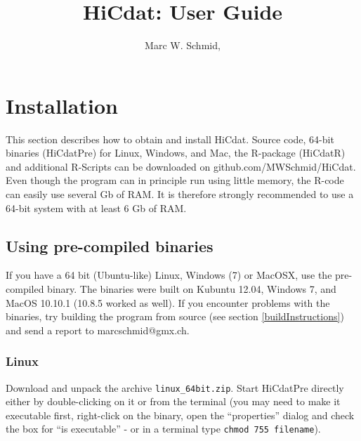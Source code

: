 \documentclass[a4paper,10pt]{article}
\title{HiCdat: User Guide}
\author{Marc W. Schmid, {\myEmail}}
\makeatletter
\newcommand{\myEmail}{marcschmid@gmx.ch}
\newcommand{\myWeb}{github.com/MWSchmid/HiCdat}
\makeatother
\begin{document}
\maketitle

\thispagestyle{empty}
\clearpage
\pagestyle{plain}
\setcounter{page}{1}
\tableofcontents
\clearpage
\pagestyle{plain}
\setcounter{page}{1}
\section{Installation}
This section describes how to obtain and install HiCdat. Source code, 64-bit binaries (HiCdatPre) for Linux, Windows, and Mac, the R-package (HiCdatR) and additional R-Scripts can be downloaded on {\myWeb}. Even though the program can in principle run using little memory, the R-code can easily use several Gb of RAM. It is therefore strongly recommended to use a 64-bit system with at least 6 Gb of RAM.%
\subsection{Using pre-compiled binaries}
If you have a 64 bit (Ubuntu-like) Linux, Windows (7) or MacOSX, use the pre-compiled binary. The binaries were built on Kubuntu 12.04, Windows 7, and MacOS 10.10.1 (10.8.5 worked as well). If you encounter problems with the binaries, try building the program from source (see section \ref{buildInstructions}) and send a report to {\myEmail}.
\subsubsection{Linux}
Download and unpack the archive \texttt{linux\_64bit.zip}. Start HiCdatPre directly either by double-clicking on it or from the terminal (you may need to make it executable first, right-click on the binary, open the ``properties'' dialog and check the box for ``is executable'' - or in a terminal type \texttt{chmod 755 filename}).
\end{document}
